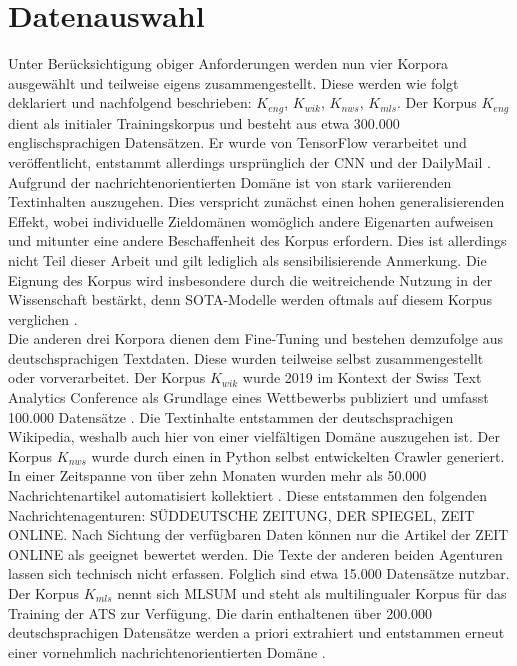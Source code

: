 \section{Datenauswahl}
\noindent
Unter Berücksichtigung obiger Anforderungen werden nun vier Korpora ausgewählt und teilweise eigens zusammengestellt. Diese werden wie folgt deklariert und nachfolgend beschrieben: $K_{eng}$, $K_{wik}$, $K_{nws}$, $K_{mls}$. Der Korpus $K_{eng}$ dient als initialer Trainingskorpus und besteht aus etwa 300.000 englischsprachigen Datensätzen. Er wurde von TensorFlow verarbeitet und veröffentlicht, entstammt allerdings ursprünglich der CNN und der DailyMail \cite{TEN21}. Aufgrund der nachrichtenorientierten Domäne ist von stark variierenden Textinhalten auszugehen. Dies verspricht zunächst einen hohen generalisierenden Effekt, wobei individuelle Zieldomänen womöglich andere Eigenarten aufweisen und mitunter eine andere Beschaffenheit des Korpus erfordern. Dies ist allerdings nicht Teil dieser Arbeit und gilt lediglich als sensibilisierende Anmerkung. Die Eignung des Korpus wird insbesondere durch die weitreichende Nutzung in der Wissenschaft bestärkt, denn \ac{SOTA}-Modelle werden oftmals auf diesem Korpus verglichen \cite[S.~6]{ROT20}.\\

\noindent
Die anderen drei Korpora dienen dem Fine-Tuning und bestehen demzufolge aus deutschsprachigen Textdaten. Diese wurden teilweise selbst zusammengestellt oder vorverarbeitet. Der Korpus $K_{wik}$ wurde 2019 im Kontext der Swiss Text Analytics Conference als Grundlage eines Wettbewerbs publiziert und umfasst 100.000 Datensätze \cite{CIE19}. Die Textinhalte entstammen der deutschsprachigen Wikipedia, weshalb auch hier von einer vielfältigen Domäne auszugehen ist. Der Korpus $K_{nws}$ wurde durch einen in Python selbst entwickelten Crawler generiert. In einer Zeitspanne von über zehn Monaten wurden mehr als 50.000 Nachrichtenartikel automatisiert kollektiert \cite[S.~79,~83,~416]{BIR09}. Diese entstammen den folgenden Nachrichtenagenturen: SÜDDEUTSCHE ZEITUNG, DER SPIEGEL, ZEIT ONLINE. Nach Sichtung der verfügbaren Daten können nur die Artikel der ZEIT ONLINE als geeignet bewertet werden. Die Texte der anderen beiden Agenturen lassen sich technisch nicht erfassen. Folglich sind etwa 15.000 Datensätze nutzbar. Der Korpus $K_{mls}$ nennt sich MLSUM und steht als multilingualer Korpus für das Training der \ac{ATS} zur Verfügung. Die darin enthaltenen über 200.000 deutschsprachigen Datensätze werden a priori extrahiert und entstammen erneut einer vornehmlich nachrichtenorientierten Domäne \cite{SCI20}.\\

